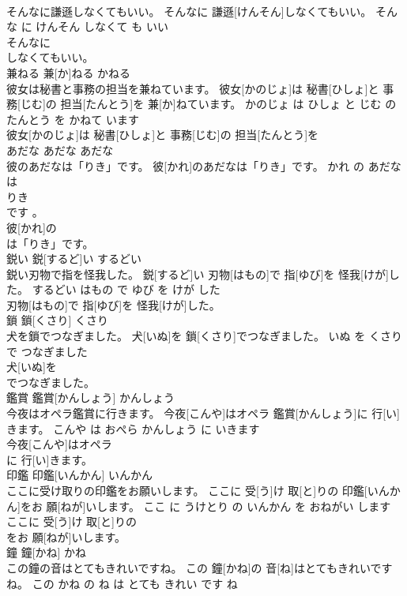 \documentclass[8pt]{extreport}
\begin{document}
\begin{CJK}{UTF8}{min}
\\	そんなに謙遜しなくてもいい。	そんなに 謙遜[けんそん]しなくてもいい。	そんな に けんそん しなくて も いい	
\\	そんなに
\\	しなくてもいい。			
\\	兼ねる	兼[か]ねる	かねる	
\\	彼女は秘書と事務の担当を兼ねています。	彼女[かのじょ]は 秘書[ひしょ]と 事務[じむ]の 担当[たんとう]を 兼[か]ねています。	かのじょ は ひしょ と じむ の たんとう を かねて います	
\\	彼女[かのじょ]は 秘書[ひしょ]と 事務[じむ]の 担当[たんとう]を
\\	あだな	あだな	あだな	
\\	彼のあだなは「りき」です。	彼[かれ]のあだなは「りき」です。	かれ の あだな は 
\\	りき 
\\	です 。	
\\	彼[かれ]の
\\	は「りき」です。			
\\	鋭い	鋭[するど]い	するどい	
\\	鋭い刃物で指を怪我した。	鋭[するど]い 刃物[はもの]で 指[ゆび]を 怪我[けが]した。	するどい はもの で ゆび を けが した	
\\	刃物[はもの]で 指[ゆび]を 怪我[けが]した。			
\\	鎖	鎖[くさり]	くさり	
\\	犬を鎖でつなぎました。	犬[いぬ]を 鎖[くさり]でつなぎました。	いぬ を くさり で つなぎました	
\\	犬[いぬ]を
\\	でつなぎました。			
\\	鑑賞	鑑賞[かんしょう]	かんしょう	
\\	今夜はオペラ鑑賞に行きます。	今夜[こんや]はオペラ 鑑賞[かんしょう]に 行[い]きます。	こんや は おぺら かんしょう に いきます	
\\	今夜[こんや]はオペラ
\\	に 行[い]きます。			
\\	印鑑	印鑑[いんかん]	いんかん	
\\	ここに受け取りの印鑑をお願いします。	ここに 受[う]け 取[と]りの 印鑑[いんかん]をお 願[ねが]いします。	ここ に うけとり の いんかん を おねがい します	
\\	ここに 受[う]け 取[と]りの
\\	をお 願[ねが]いします。			
\\	鐘	鐘[かね]	かね	
\\	この鐘の音はとてもきれいですね。	この 鐘[かね]の 音[ね]はとてもきれいですね。	この かね の ね は とても きれい です ね	

\end{CJK}
\end{document}
